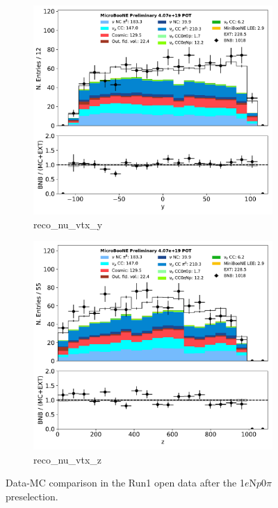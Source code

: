 \documentclass[a4paper]{article}
\newcommand{\npsel}{1$e$N$p$0$\pi$ }
\begin{document}
\begin{figure}[H]
\begin{center}
\begin{subfigure}[b]{0.3\textwidth}
    \includegraphics[width=1.00\textwidth]{1eNp/dataMCRun1/reco_nu_vtx_y01152020.pdf}
    \caption{\label{fig:1eNp:dataMCRun1:reco_nu_vtx_y} reco\_nu\_vtx\_y}
    \end{subfigure}
    \begin{subfigure}[b]{0.3\textwidth}
    \centering
    \includegraphics[width=1.00\textwidth]{1eNp/dataMCRun1/reco_nu_vtx_z01152020.pdf}
    \caption{\label{fig:1eNp:dataMCRun1:reco_nu_vtx_z} reco\_nu\_vtx\_z}
    \end{subfigure}
\caption{\label{fig:1eNp:dataMCRun1:reco_nu_vtx}Data-MC comparison in the Run1 open data after the \npsel preselection.}
\end{center}
\end{figure}
\end{document}
